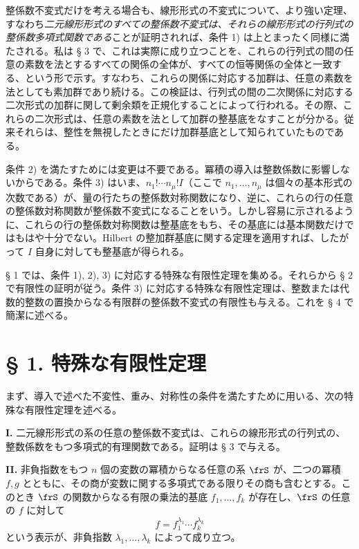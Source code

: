 \documentclass[11pt]{article}
\begin{document}
整係数不変式だけを考える場合も、線形形式の不変式について、より強い定理、すなわち\emph{二元線形形式のすべての整係数不変式は、それらの線形形式の行列式の整係数多項式関数である}ことが証明されれば、条件 1) は上とまったく同様に満たされる。私は § 3 で、これは実際に成り立つことを、これらの行列式の間の任意の素数を法とするすべての関係の全体が、すべての恒等関係の全体と一致する、という形で示す。すなわち、これらの関係に対応する加群は、任意の素数を法としても素加群であり続ける。この検証は、行列式の間の二次関係に対応する二次形式の加群に関して剰余類を正規化することによって行われる。その際、これらの二次形式は、任意の素数を法として加群の整基底をなすことが分かる。従来それらは、整性を無視したときにだけ加群基底として知られていたものである。

条件 2) を満たすためには変更は不要である。冪積の導入は整数係数に影響しないからである。条件 3) はいま、\(n_1!\cdots n_\mu! I\)（ここで \(n_1,\ldots,n_\mu\) は個々の基本形式の次数である）が、量の行たちの整係数対称関数になり、逆に、これらの行の任意の整係数対称関数が整係数不変式になることをいう。しかし容易に示されるように、これらの行の整係数対称関数は整基底をもち、その基底には基本関数だけではもはや十分でない。Hilbert の整加群基底に関する定理を適用すれば、したがって \(I\) 自身に対しても整基底が得られる。

§ 1 では、条件 1), 2), 3) に対応する特殊な有限性定理を集める。それらから § 2 で有限性の証明が従う。条件 3) に対応する特殊な有限性定理は、整数または代数的整数の置換からなる有限群の整係数不変式の有限性も与える。これを § 4 で簡潔に述べる。

\section*{§ 1. 特殊な有限性定理}

まず、導入で述べた不変性、重み、対称性の条件を満たすために用いる、次の特殊な有限性定理を述べる。

\textbf{I.} 二元線形形式の系の任意の整係数不変式は、これらの線形形式の行列式の、整数係数をもつ多項式的有理関数である。証明は § 3 で与える。

\textbf{II.} 非負指数をもつ \(n\) 個の変数の冪積からなる任意の系 \(\frS\) が、二つの冪積 \(f,g\) とともに、その商が変数に関する多項式である限りその商も含むとする。このとき \(\frS\) の関数からなる有限の乗法的基底 \(f_1,\ldots,f_k\) が存在し、\(\frS\) の任意の \(f\) に対して
\[
        f=f_1^{\lambda_1}\cdots f_k^{\lambda_k}
\]
という表示が、非負指数 \(\lambda_1,\ldots,\lambda_k\) によって成り立つ。
\end{document}

